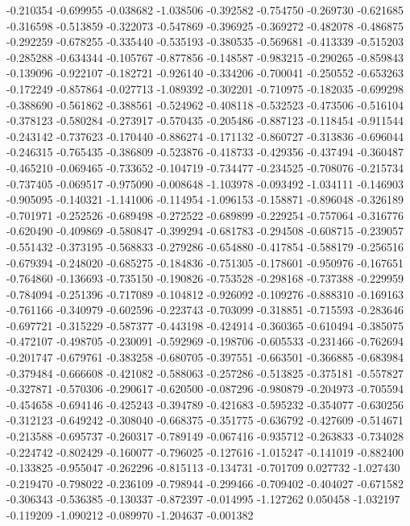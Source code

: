 -0.210354
-0.699955
-0.038682
-1.038506
-0.392582
-0.754750
-0.269730
-0.621685
-0.316598
-0.513859
-0.322073
-0.547869
-0.396925
-0.369272
-0.482078
-0.486875
-0.292259
-0.678255
-0.335440
-0.535193
-0.380535
-0.569681
-0.413339
-0.515203
-0.285288
-0.634344
-0.105767
-0.877856
-0.148587
-0.983215
-0.290265
-0.859843
-0.139096
-0.922107
-0.182721
-0.926140
-0.334206
-0.700041
-0.250552
-0.653263
-0.172249
-0.857864
-0.027713
-1.089392
-0.302201
-0.710975
-0.182035
-0.699298
-0.388690
-0.561862
-0.388561
-0.524962
-0.408118
-0.532523
-0.473506
-0.516104
-0.378123
-0.580284
-0.273917
-0.570435
-0.205486
-0.887123
-0.118454
-0.911544
-0.243142
-0.737623
-0.170440
-0.886274
-0.171132
-0.860727
-0.313836
-0.696044
-0.246315
-0.765435
-0.386809
-0.523876
-0.418733
-0.429356
-0.437494
-0.360487
-0.465210
-0.069465
-0.733652
-0.104719
-0.734477
-0.234525
-0.708076
-0.215734
-0.737405
-0.069517
-0.975090
-0.008648
-1.103978
-0.093492
-1.034111
-0.146903
-0.905095
-0.140321
-1.141006
-0.114954
-1.096153
-0.158871
-0.896048
-0.326189
-0.701971
-0.252526
-0.689498
-0.272522
-0.689899
-0.229254
-0.757064
-0.316776
-0.620490
-0.409869
-0.580847
-0.399294
-0.681783
-0.294508
-0.608715
-0.239057
-0.551432
-0.373195
-0.568833
-0.279286
-0.654880
-0.417854
-0.588179
-0.256516
-0.679394
-0.248020
-0.685275
-0.184836
-0.751305
-0.178601
-0.950976
-0.167651
-0.764860
-0.136693
-0.735150
-0.190826
-0.753528
-0.298168
-0.737388
-0.229959
-0.784094
-0.251396
-0.717089
-0.104812
-0.926092
-0.109276
-0.888310
-0.169163
-0.761166
-0.340979
-0.602596
-0.223743
-0.703099
-0.318851
-0.715593
-0.283646
-0.697721
-0.315229
-0.587377
-0.443198
-0.424914
-0.360365
-0.610494
-0.385075
-0.472107
-0.498705
-0.230091
-0.592969
-0.198706
-0.605533
-0.231466
-0.762694
-0.201747
-0.679761
-0.383258
-0.680705
-0.397551
-0.663501
-0.366885
-0.683984
-0.379484
-0.666608
-0.421082
-0.588063
-0.257286
-0.513825
-0.375181
-0.557827
-0.327871
-0.570306
-0.290617
-0.620500
-0.087296
-0.980879
-0.204973
-0.705594
-0.454658
-0.694146
-0.425243
-0.394789
-0.421683
-0.595232
-0.354077
-0.630256
-0.312123
-0.649242
-0.308040
-0.668375
-0.351775
-0.636792
-0.427609
-0.514671
-0.213588
-0.695737
-0.260317
-0.789149
-0.067416
-0.935712
-0.263833
-0.734028
-0.224742
-0.802429
-0.160077
-0.796025
-0.127616
-1.015247
-0.141019
-0.882400
-0.133825
-0.955047
-0.262296
-0.815113
-0.134731
-0.701709
0.027732
-1.027430
-0.219470
-0.798022
-0.236109
-0.798944
-0.299466
-0.709402
-0.404027
-0.671582
-0.306343
-0.536385
-0.130337
-0.872397
-0.014995
-1.127262
0.050458
-1.032197
-0.119209
-1.090212
-0.089970
-1.204637
-0.001382
